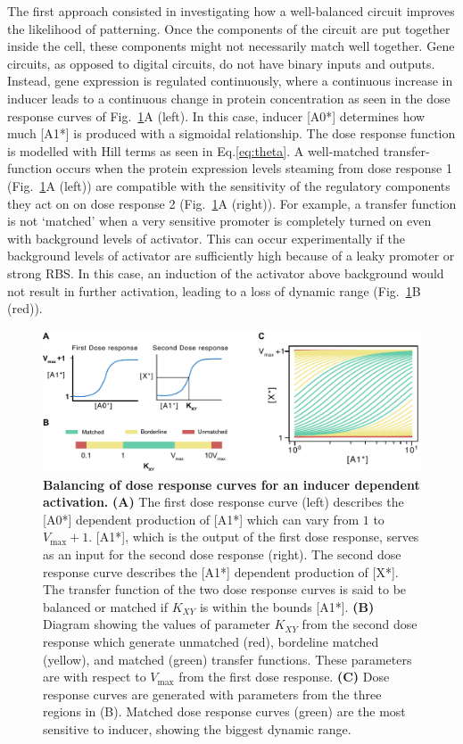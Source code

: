 The first approach consisted in investigating how a well-balanced circuit improves the likelihood of patterning.
Once the components of the circuit are put together inside the cell,
these components might not necessarily match well together.
Gene circuits, as opposed to digital circuits, do not have binary inputs and outputs.
Instead, gene expression is regulated continuously,
where a continuous increase in inducer leads to a continuous change in protein concentration
as seen in the dose response curves of Fig.~\ref{fig:balancing}A
(left).
In this case, inducer [A0*] determines how much [A1*] is produced with a sigmoidal relationship.
The dose response function is modelled with Hill terms as seen in Eq.\ref{eq:theta}.
A well-matched transfer-function occurs when the protein expression levels steaming from dose response 1
(Fig.~\ref{fig:balancing}A (left))
are compatible with the sensitivity of the regulatory components they act on on dose response 2
(Fig.~\ref{fig:balancing}A (right)).
For example, a transfer function is not ‘matched’
when a very sensitive promoter is completely turned on even with background levels of activator.
This can occur experimentally
if the background levels of activator are sufficiently high because of a leaky promoter or strong RBS.
In this case, an induction of the activator above background would not result in further activation,
leading to a loss of dynamic range (Fig.~\ref{fig:balancing}B (red)).


\begin{figure}[H]
    \centering
    \includegraphics[width=1\textwidth]{chapters/Chapter 2/balancing}
    \caption{\textbf{Balancing of dose response curves for an inducer dependent activation.} \textbf{(A)} The first dose response curve (left) describes the [A0*] dependent production of [A1*] which can vary from $1$ to $V_{\max}+1 $. [A1*], which is the output of the first dose response, serves as an input for the second dose response (right). The second dose response curve describes the [A1*] dependent production of [X*]. The transfer function of the two dose response curves is said to be balanced or matched if $K_{XY}$ is within the bounds [A1*]. \textbf{(B)} Diagram showing the values of parameter $K_{XY}$ from the second dose response which generate unmatched (red), bordeline matched (yellow), and matched (green) transfer functions. These parameters are with respect to $V_{\max}$ from the first dose response. \textbf{(C)} Dose response curves are generated with parameters from the three regions in (B). Matched dose response curves (green) are the most sensitive to inducer, showing the biggest dynamic range. }
    \label{fig:balancing}
\end{figure}


